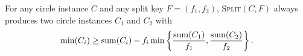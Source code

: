 \documentclass[a4paper,style=print,oneside,bibliography=totoc,nexus,lnum,extramargin]{tubsbook}
\begin{document}
\begin{lemma}\label{th:min1}

    For any circle instance $C$ and any split key $F = (f_1, f_2)$, \textsc{Split}$(C,F)$ always produces two circle instances $C_1$ and $C_2$ with
    $$\min(C_i) \ge \operatorname{sum}(C_i) - f_i\min\left\{\frac{\operatorname{sum}(C_1)}{f_1},\frac{\operatorname{sum}(C_2)}{f_2}\right\}.$$


\end{lemma}
\end{document}
